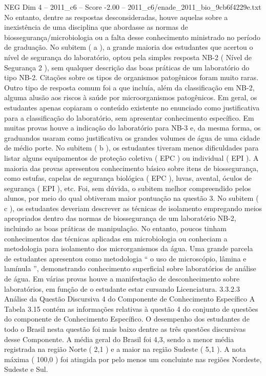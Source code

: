 \begin{textsample}{NEG Dim 4 – 2011\_c6 – Score -2.00 – 2011\_c6/enade\_2011\_bio\_9cb6f4229e.txt}
No entanto, dentre as respostas desconsideradas, houve aquelas sobre a inexistência de uma disciplina que abordasse as normas de biossegurança/microbiologia ou a falta desse conhecimento ministrado no período de graduação.
No subitem ( a ), a grande maioria dos estudantes que acertou o nível de segurança do laboratório, optou pela simples resposta NB-2 ( Nível de Segurança 2 ), sem qualquer descrição das boas práticas de um laboratório do tipo NB-2.
Citações sobre os tipos de organismos patogênicos foram muito raras.
Outro tipo de resposta comum foi a que incluía, além da classificação em NB-2, alguma alusão aos riscos à saúde por microorganismos patogênicos.
Em geral, os estudantes apenas copiaram o conteúdo existente no enunciado como justificativa para a classificação do laboratório, sem apresentar conhecimento específico.
Em muitas provas houve a indicação do laboratório para NB-3 e, da mesma forma, os graduandos usaram como justificativa os grandes volumes de água de uma cidade de médio porte.
No subitem ( b ), os estudantes tiveram menos dificuldades para listar alguns equipamentos de proteção coletiva ( EPC ) ou individual ( EPI ).
A maioria das provas apresentou conhecimento básico sobre itens de biossegurança, como estufas, capelas de segurança biológica ( EPC ), luvas, avental, óculos de segurança ( EPI ), etc.
Foi, sem dúvida, o subitem melhor compreendido pelos alunos, por meio do qual obtiveram maior pontuação na questão 3.
No subitem ( c ), os estudantes deveriam descrever as técnicas de isolamento empregando meios apropriados dentro das normas de biossegurança de um laboratório NB-2, incluindo as boas práticas de manipulação.
No entanto, poucos tinham conhecimentos das técnicas aplicadas em microbiologia ou conheciam a metodologia para isolamento dos microrganismos da água.
Uma grande parcela de estudantes apresentou como metodologia “ o uso de microscópio, lâmina e lamínula ”, demonstrando conhecimento superficial sobre laboratórios de análise de água.
Em várias provas houve a manifestação de desconhecimento sobre laboratórios, em função de o estudante estar cursando Licenciatura. 3.3.2.3 Análise da Questão Discursiva 4 do Componente de Conhecimento Específico A Tabela 3.15 contém as informações relativas à questão 4 do conjunto de questões do componente de Conhecimento Específico.
O desempenho dos estudantes de todo o Brasil nesta questão foi mais baixo dentre as três questões discursivas desse Componente.
A média geral do Brasil foi 4,3, sendo a menor média registrada na região Norte ( 2,1 ) e a maior na região Sudeste ( 5,1 ).
A nota máxima ( 100,0 ) foi atingida por pelo menos um concluinte nas regiões Nordeste, Sudeste e Sul.

\end{textsample}
